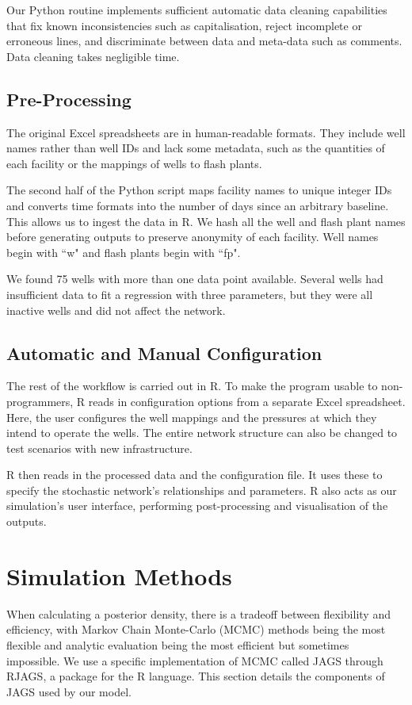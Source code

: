 \documentclass[a4paper, 12pt]{article}
\begin{document}
Our Python routine implements sufficient automatic data cleaning capabilities that fix known inconsistencies such as capitalisation, reject incomplete or erroneous lines, and discriminate between data and meta-data such as comments. Data cleaning takes negligible time.

\subsection{Pre-Processing}
The original Excel spreadsheets are in human-readable formats. They include well names rather than well IDs and lack some metadata, such as the quantities of each facility or the mappings of wells to flash plants.

The second half of the Python script maps facility names to unique integer IDs and converts time formats into the number of days since an arbitrary baseline. This allows us to ingest the data in R. We hash all the well and flash plant names before generating outputs to preserve anonymity of each facility. Well names begin with ``w" and flash plants begin with ``fp".

We found 75 wells with more than one data point available. Several wells had insufficient data to fit a regression with three parameters, but they were all inactive wells and did not affect the network.

\subsection{Automatic and Manual Configuration}
The rest of the workflow is carried out in R. To make the program usable to non-programmers, R reads in configuration options from a separate Excel spreadsheet. Here, the user configures the well mappings and the pressures at which they intend to operate the wells. The entire network structure can also be changed to test scenarios with new infrastructure.

R then reads in the processed data and the configuration file. It uses these to specify the stochastic network's relationships and parameters. R also acts as our simulation's user interface, performing post-processing and visualisation of the outputs.

\section{Simulation Methods}
When calculating a posterior density, there is a tradeoff between flexibility and efficiency, with Markov Chain Monte-Carlo (MCMC) methods being the most flexible and analytic evaluation being the most efficient but sometimes impossible. We use a specific implementation of MCMC called JAGS through RJAGS, a package for the R language. This section details the components of JAGS used by our model.
\end{document}
